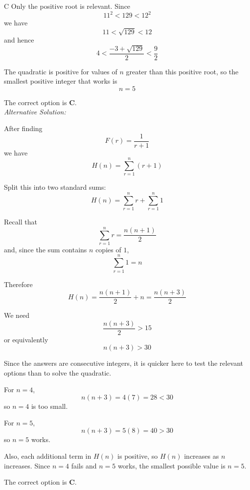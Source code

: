 \documentclass[11pt,a4paper]{article}
\begin{document}
\begin{enumerate}[label=\textbf{\arabic*.},leftmargin=*,itemsep=0pt,start=13]
\begin{djsSolution}{C}
Only the positive root is relevant. Since
\[
11^2<129<12^2
\]
we have
\[
11<\sqrt{129}<12
\]
and hence
\[
4<\frac{-3+\sqrt{129}}{2}<\frac92
\]

The quadratic is positive for values of \(n\) greater than this positive root, so the smallest positive integer that works is
\[
n=5
\]

The correct option is \textbf{C}.\\[5pt]

\textit{Alternative Solution:}

After finding
\[
F(r)=\frac{1}{r+1}
\]
we have
\[
H(n)=\sum_{r=1}^{n}(r+1)
\]

Split this into two standard sums:
\[
H(n)=\sum_{r=1}^{n}r+\sum_{r=1}^{n}1
\]

Recall that
\[
\sum_{r=1}^{n}r=\frac{n(n+1)}{2}
\]
and, since the sum contains \(n\) copies of \(1\),
\[
\sum_{r=1}^{n}1=n
\]

Therefore
\[
H(n)
=\frac{n(n+1)}{2}+n
=\frac{n(n+3)}{2}
\]

We need
\[
\frac{n(n+3)}{2}>15
\]
or equivalently
\[
n(n+3)>30
\]

Since the answers are consecutive integers, it is quicker here to test the relevant options than to solve the quadratic.

For \(n=4\),
\[
n(n+3)=4(7)=28<30
\]
so \(n=4\) is too small.

For \(n=5\),
\[
n(n+3)=5(8)=40>30
\]
so \(n=5\) works.

Also, each additional term in \(H(n)\) is positive, so \(H(n)\) increases as \(n\) increases. Since \(n=4\) fails and \(n=5\) works, the smallest possible value is \(n=5\).

The correct option is \textbf{C}.
\end{djsSolution}
\end{enumerate}
\clearpage
\thispagestyle{djssolutions}
\vspace*{8pt}
\end{document}
